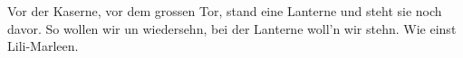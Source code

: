 \beginverse*
Vor der Kaserne, vor dem grossen Tor,
stand eine Lanterne und steht sie noch davor.
So wollen wir un wiedersehn,
bei der Lanterne woll’n wir stehn.
Wie einst Lili-Marleen.
\endverse
\endsong